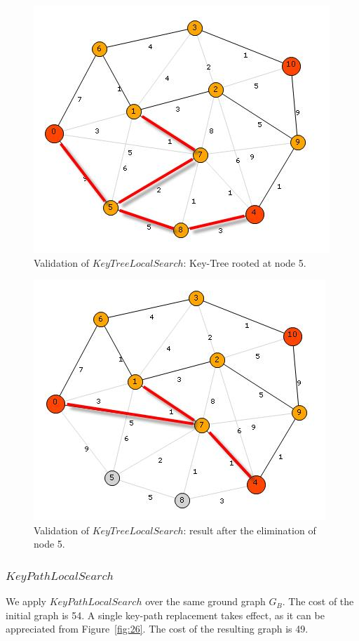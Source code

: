 \begin{figure}[H]
\begin{center}
\includegraphics[scale=0.9]{23.jpg}
\caption{Validation of $KeyTreeLocalSearch$: Key-Tree rooted at node 5.}\label{fig:23}
\end{center} 
\end{figure}

\begin{figure}[H]
\begin{center}
\includegraphics[scale=0.9]{24.jpg}
\caption{Validation of $KeyTreeLocalSearch$: result after the elimination of node 5.}\label{fig:24}
\end{center} 
\end{figure}

\subsubsection{$KeyPathLocalSearch$}
We apply $KeyPathLocalSearch$ over the same ground graph $G_B$. The cost of the initial graph is 54. A single key-path replacement takes effect, as it can be appreciated from Figure~\ref{fig:26}. The cost of the resulting graph is 49.

